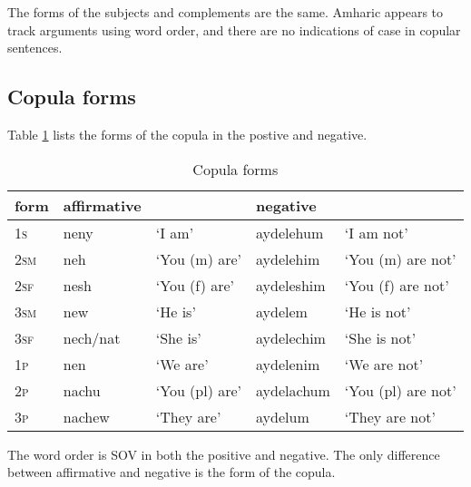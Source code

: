 \documentclass[12pt]{article}
\begin{document}
The forms of the subjects and complements are the same. Amharic appears to track arguments using word order, and there are no indications of case in copular sentences.

\subsection{Copula forms}
\iffalse
b. Present tense and negative forms of the copula. Give the different person and number forms of the copula in the present tense in affirmative and negative forms:
neny ‘I am’                                                          aydelehum ‘I am not’
neh ‘you m. are’                                                  aydelehim ‘you m. are not’
If you feel you can divide these forms into morphemes, then add hyphens.
\fi

Table \ref{tab:copula} lists the forms of the copula in the postive and negative.

\begin{table}[ht]
\centering
\caption{Copula forms}
\label{tab:copula}
  \begin{tabular}{l|llll}
    form & affirmative & & negative & \\ \hline
    \textsc{1s}  & neny & `I am'          & aydelehum & `I am not'\\
    \textsc{2sm} & neh & `You (m) are'    & aydelehim & `You (m) are not'\\
    \textsc{2sf} & nesh & `You (f) are'   & aydeleshim & `You (f) are not'\\
    \textsc{3sm} & new & `He is'          & aydelem & `He is not'\\
    \textsc{3sf} & nech/nat & `She is'    & aydelechim & `She is not'\\
    \textsc{1p}  & nen & `We are'         & aydelenim & `We are not'\\
    \textsc{2p}  & nachu & `You (pl) are' & aydelachum & `You (pl) are not'\\
    \textsc{3p}  & nachew & `They are'    & aydelum & `They are not'\\
  \end{tabular}
\end{table}

The word order is SOV in both the positive and negative. The only difference between affirmative and negative is the form of the copula.
\end{document}
